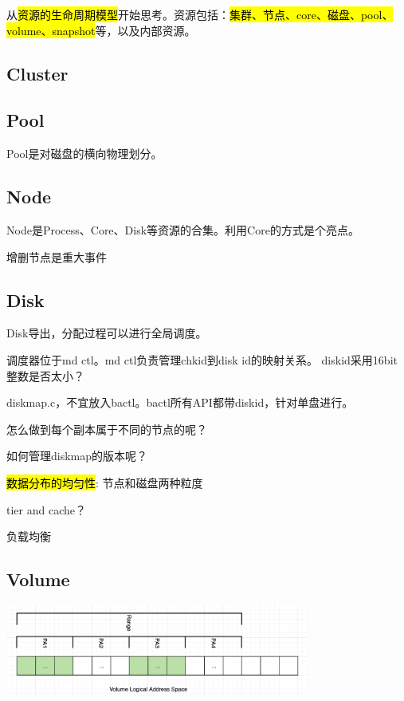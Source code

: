 从\hl{资源的生命周期模型}开始思考。资源包括：\hl{集群、节点、core、磁盘、pool、volume、snapshot}等，以及内部资源。

\subsection{Cluster}

\subsection{Pool}

Pool是对磁盘的横向物理划分。

\subsection{Node}

Node是Process、Core、Disk等资源的合集。利用Core的方式是个亮点。

增删节点是重大事件

\subsection{Disk}

Disk导出，分配过程可以进行全局调度。

调度器位于md ctl。md ctl负责管理chkid到disk id的映射关系。
diskid采用16bit整数是否太小？

diskmap.c，不宜放入bactl。bactl所有API都带diskid，针对单盘进行。

怎么做到每个副本属于不同的节点的呢？

如何管理diskmap的版本呢？

\hl{数据分布的均匀性}: 节点和磁盘两种粒度

tier and cache？

负载均衡

\subsection{Volume}

\begin{center}
\includegraphics[width=10cm]{../imgs/volume-addressspace.png}
\end{center}


